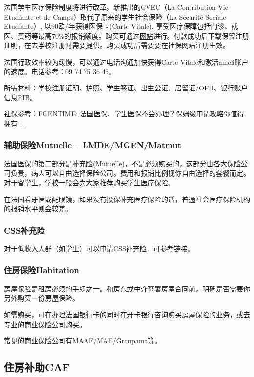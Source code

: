 法国学生医疗保险制度将进行改革，新推出的CVEC（La Contribution Vie Etudiante et de Camps）取代了原来的学生社会保险（La Sécurité Sociale Etudiante）, 以90欧/年获得医保卡(Carte Vitale), 享受医疗保障包括门诊、就医、买药等最高70\%的报销额度。购买可通过\href{https://www.messervices.etudiant.gouv.fr}{网站}进行。付款成功后下载保留注册证明，在去学校注册时需要提供。购买成功后需要要在社保网站注册生效。

法国行政效率较为缓慢，可以通过电话沟通加快获得Carte Vitale和激活ameli账户的速度。\href{https://www.ameli.fr/paris/assure/english-pages}{电话参考}：09 74 75 36 46。

所需材料：学校注册证明、护照、学生签证、出生公证、居留证/OFII、银行账户信息RIB。

社保参考：\href{https://www.ecentime.com/article/assurance-maladie}{ECENTIME: 法国医保、学生医保不会办理？保姆级申请攻略你值得拥有！}
 
\subsubsection{辅助保险Mutuelle – LMDE/MGEN/Matmut}

法国医保的第二部分是补充险(Mutuelle)，不是必须购买的，这部分由各大保险公司负责，病人可以自由选择保险公司。费用和报销比例视你自由选择的套餐而定。对于留学生，学校一般会为大家推荐购买学生医疗保险。

在法国看牙医或配眼镜，如果没有投保补充医疗保险的话，普通社会医疗保险机构的报销水平则会较差。

\subsubsection{CSS补充险}
对于低收入人群（如学生）可以申请CSS补充险，可参考\href{https://www.xiaohongshu.com/explore/6244b05d00000000210386be?note_flow_source=wechat}{链接}。

\subsubsection{住房保险Habitation} 
房屋保险是租房必须的手续之一。和房东或中介签署房屋合同前，明确是否需要你另外购买一份房屋保险。

如需购买，可在办理法国银行卡的同时在开卡银行咨询购买房屋保险的业务，或去专业的商业保险公司购买。

常见的商业保险公司有MAAF/MAE/Groupama等。

\subsection{住房补助CAF}
	
